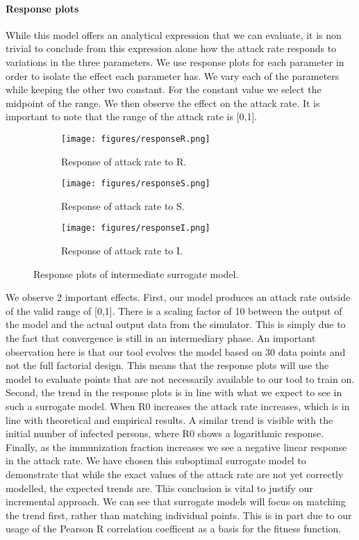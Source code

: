 \paragraph{Response plots}
While this model offers an analytical expression that we can evaluate, it is non trivial to conclude from this expression alone how the attack rate responds to variations in the three parameters. We use response plots for each parameter in order to isolate the effect each parameter has. We vary each of the parameters while keeping the other two constant. For the constant value we select the midpoint of the range. We then observe the effect on the attack rate. It is important to note that the range of the attack rate is [0,1]. 
\begin{figure}
    \begin{subfigure}{0.9\textwidth}
        \texttt{[image: figures/responseR.png]}
        \caption{Response of attack rate to R.}
    \end{subfigure}
    \begin{subfigure}{0.9\textwidth}
        \texttt{[image: figures/responseS.png]}
        \caption{Response of attack rate to S.}
    \end{subfigure}
        \begin{subfigure}{0.9\textwidth}
        \texttt{[image: figures/responseI.png]}
        \caption{Response of attack rate to I.}
    \end{subfigure}
    \caption{Response plots of intermediate surrogate model.}
    \label{fig:usecaseresponseplots}
\end{figure}
We observe 2 important effects. First, our model produces an attack rate outside of the valid range of [0,1]. There is a scaling factor of 10 between the output of the model and the actual output data from the simulator. This is simply due to the fact that convergence is still in an intermediary phase. An important observation here is that our tool evolves the model based on 30 data points and not the full factorial design. This means that the response plots will use the model to evaluate points that are not necessarily available to our tool to train on. Second, the trend in the response plots is in line with what we expect to see in such a surrogate model. When R0 increases the attack rate increases, which is in line with theoretical and empirical results. A similar trend is visible with the initial number of infected persons, where R0 shows a logarithmic response. Finally, as the immunization fraction increases we see a negative linear response in the attack rate. We have chosen this suboptimal surrogate model to demonstrate that while the exact values of the attack rate are not yet correctly modelled, the expected trends are. This conclusion is vital to justify our incremental approach. We can see that surrogate models will focus on matching the trend first, rather than matching individual points. This is in part due to our usage of the Pearson R correlation coefficent as a basis for the fitness function. 



